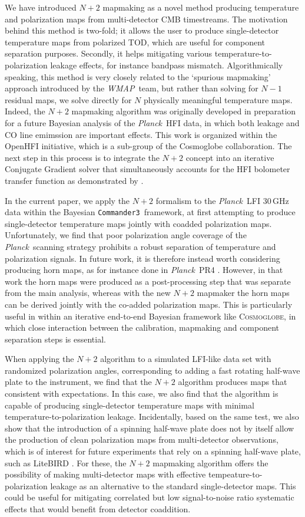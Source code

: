 \documentclass{aa}
\def\commanderthree{\texttt{Commander3}}
\newcommand{\Cosmoglobe}{\textsc{Cosmoglobe}}
\def\Cosmoglobe{\textsc{Cosmoglobe}}
\def\Planck{\textit{Planck}}
\def\WMAP{\textit{WMAP}}
\begin{document}
We have introduced $N+2$ mapmaking as a novel method producing temperature and polarization maps from multi-detector CMB timestreams. The motivation behind this method is two-fold; it allows the user to produce single-detector temperature maps from polarized TOD, which are useful for component separation purposes. Secondly, it helps mitigating various temperature-to-polarization leakage effects, for instance bandpass mismatch. Algorithmically speaking, this method is very closely related to the `spurious mapmaking' approach introduced by the \WMAP\ team, but rather than solving for $N-1$ residual maps, we solve directly for $N$ physically meaningful temperature maps. Indeed, the $N+2$ mapmaking algorithm was originally developed in preparation for a future Bayesian analysis of the \Planck\ HFI data, in which both leakage and CO line emimssion are important effects. This work is organized within the OpenHFI initiative, which is a sub-group of the Cosmoglobe collaboration. The next step in this process is to integrate the $N+2$ concept into an iterative Conjugate Gradient solver that simultaneously accounts for the HFI bolometer transfer function as demonstrated by \cite{artem}. 

In the current paper, we apply the $N+2$ formalism to the \Planck\ LFI 30\,GHz data within the Bayesian \commanderthree\ framework, at first attempting to produce single-detector temperature maps jointly with coadded polarization maps. Unfortunately, we find that poor polarization angle coverage of the \Planck\ scanning strategy prohibits a robust separation of temperature and polarization signals. In future work, it is therefore instead worth considering producing horn maps, as for instance done in \Planck\ PR4 \citep{npipe}. However, in that work the horn maps were produced as a post-processing step that was separate from the main analysis, whereas with the new $N+2$ mapmaker the horn maps can be derived jointly with the co-added polarization maps. This is particularly useful in within an iterative end-to-end Bayesian framework like \Cosmoglobe, in which close interaction between the calibration, mapmaking and component separation steps is essential.    

When applying the $N+2$ algorithm to a simulated LFI-like data set with randomized polarization angles, corresponding to adding a fast rotating half-wave plate to the instrument, we find that the $N+2$ algorithm produces maps that consistent with expectations. In this case, we also find that the algorithm is capable of producing single-detector temperature maps with minimal temperature-to-polarization leakage. Incidentally, based on the same test, we also show that the introduction of a spinning half-wave plate does not by itself allow the production of clean polarization maps from multi-detector observations, which is of interest for future experiments that rely on a spinning half-wave plate, such as LiteBIRD \citep{ptep}. For these, the $N+2$ mapmaking algorithm offers the possibility of making multi-detector maps with effective tempeature-to-polarization leakage as an alternative to the standard single-detector maps. This could be useful for mitigating correlated but low signal-to-noise ratio systematic effects that would benefit from detector coaddition. 
\end{document}
